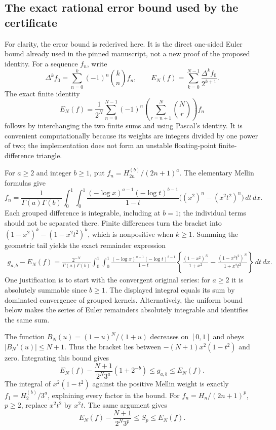 \documentclass[11pt,letterpaper]{article}
\theoremstyle{definition}
\theoremstyle{remark}
\begin{document}
\subsection{The exact rational error bound used by the certificate}

For clarity, the error bound is rederived here.  It is the direct
one-sided Euler bound already used in the pinned manuscript, not a
new proof of the proposed identity.  For a sequence $f_n$, write
\[
 \Delta^kf_0=\sum_{n=0}^k(-1)^n\binom{k}{n}f_n,
 \qquad
 E_N(f)=\sum_{k=0}^{N-1}\frac{\Delta^kf_0}{2^{k+1}}.
\]
The exact finite identity
\begin{equation}\label{oi:eq:euler-finite}
 E_N(f)=\frac1{2^N}\sum_{n=0}^{N-1}(-1)^n
 \left(\sum_{r=n+1}^{N}\binom Nr\right)f_n
\end{equation}
follows by interchanging the two finite sums and using Pascal's
identity.  It is convenient computationally because its weights are
integers divided by one power of two; the implementation does not
form an unstable floating-point finite-difference triangle.

For $a\geq2$ and integer $b\geq1$, put
$f_n=H_{2n}^{(b)}/(2n+1)^a$.  The elementary Mellin formulas give
\[
 f_n=\frac1{\Gamma(a)\Gamma(b)}
 \int_0^1\int_0^1
 \frac{(-\log x)^{a-1}(-\log t)^{b-1}}{1-t}
 \bigl((x^2)^n-(x^2t^2)^n\bigr)\,dt\,dx.
\]
Each grouped difference is integrable, including at $b=1$; the
individual terms should not be separated there.  Finite differences
turn the bracket into
$(1-x^2)^k-(1-x^2t^2)^k$, which is nonpositive when $k\geq1$.
Summing the geometric tail yields the exact remainder expression
\begin{align*}
 g_{a,b}-E_N(f)
 =\frac{2^{-N}}{\Gamma(a)\Gamma(b)}
 \int_0^1\int_0^1
 \frac{(-\log x)^{a-1}(-\log t)^{b-1}}{1-t}
 \left\{\frac{(1-x^2)^N}{1+x^2}
       -\frac{(1-x^2t^2)^N}{1+x^2t^2}\right\}\,dt\,dx.
\end{align*}
One justification is to start with the convergent original series:
for $a\geq2$ it is absolutely summable since $b\geq1$.  The displayed
integral equals its sum by dominated convergence of grouped kernels.
Alternatively, the uniform bound below makes the series of Euler
remainders absolutely integrable and identifies the same sum.

The function $B_N(u)=(1-u)^N/(1+u)$ decreases on $[0,1]$ and obeys
$|B_N'(u)|\leq N+1$.  Thus the bracket lies between
$-(N+1)x^2(1-t^2)$ and zero.  Integrating this bound gives
\begin{equation}\label{oi:eq:gaussian-bound}
 E_N(f)-\frac{N+1}{2^N3^a}\left(1+2^{-b}\right)
 \leq g_{a,b}\leq E_N(f).
\end{equation}
The integral of $x^2(1-t^2)$ against the positive Mellin weight is
exactly $f_1=H_2^{(b)}/3^a$, explaining every factor in the bound.
For $f_n=H_n/(2n+1)^p$, $p\geq2$, replace $x^2t^2$ by $x^2t$.
The same argument gives
\begin{equation}\label{oi:eq:mixed-bound}
 E_N(f)-\frac{N+1}{2^N3^p}\leq S_p\leq E_N(f).
\end{equation}
\end{document}
